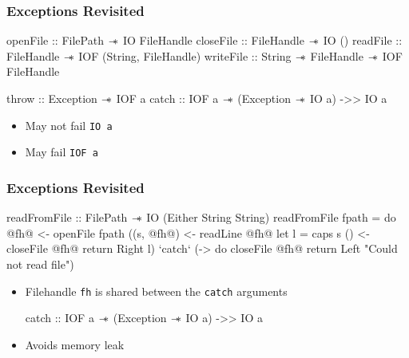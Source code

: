 \begin{frame}[fragile, c]
  \frametitle{Exceptions Revisited}
  \begin{center}
    \begin{haskell}
          openFile :: FilePath $\mathrel{-\mkern-6mu*}$ IO FileHandle
          closeFile :: FileHandle $\mathrel{-\mkern-6mu*}$ IO ()
          readFile :: FileHandle $\mathrel{-\mkern-6mu*}$ IOF (String, FileHandle)
          writeFile :: String $\mathrel{-\mkern-6mu*}$ FileHandle $\mathrel{-\mkern-6mu*}$ IOF FileHandle

          throw :: Exception $\mathrel{-\mkern-6mu*}$ IOF a
          catch :: IOF a $\mathrel{-\mkern-6mu*}$ (Exception $\mathrel{-\mkern-6mu*}$ IO a) ->> IO a
          \end{haskell}
\begin{itemize}
\item May not fail \texttt{IO a}
\item May fail \texttt{IOF a}
\end{itemize}
\end{center}
\end{frame}

\begin{frame}[fragile, c]
  \frametitle{Exceptions Revisited}
  \begin{center}
    \begin{haskell}
          readFromFile :: FilePath $\mathrel{-\mkern-6mu*}$ IO (Either String String)
          readFromFile fpath =
          do @fh@  <- openFile fpath
             ((s, @fh@)  <- readLine @fh@
             let l = caps s
             () <- closeFile @fh@
             return \dollar Right l) `catch`
                     (\e -> do closeFile @fh@
                               return \dollar Left "Could not read file")
                        \end{haskell}
                      \end{center}
     \begin{itemize}
     \item Filehandle \texttt{fh} is shared between the \texttt{catch} arguments
       \begin{haskell}
         catch :: IOF a $\mathrel{-\mkern-6mu*}$ (Exception $\mathrel{-\mkern-6mu*}$ IO a) ->> IO a
       \end{haskell}
     \item Avoids memory leak
\end{itemize}
\end{frame}


